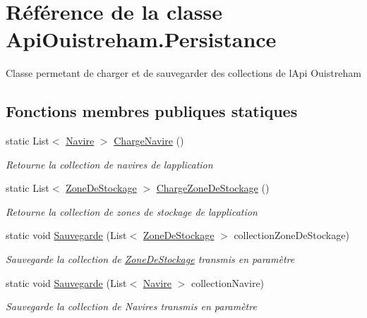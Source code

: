 \hypertarget{class_api_ouistreham_1_1_persistance}{}\section{Référence de la classe Api\+Ouistreham.\+Persistance}
\label{class_api_ouistreham_1_1_persistance}


Classe permetant de charger et de sauvegarder des collections de l\textquotesingle{}Api Ouistreham  


\subsection*{Fonctions membres publiques statiques}
\begin{DoxyCompactItemize}
\item 
static List$<$ \hyperlink{class_api_ouistreham_1_1_navire}{Navire} $>$ \hyperlink{class_api_ouistreham_1_1_persistance_a2df452ff8706e4661261fbd6bb78f467}{Charge\+Navire} ()
\begin{DoxyCompactList}\small\item\em Retourne la collection de navires de l\textquotesingle{}application \end{DoxyCompactList}\item 
static List$<$ \hyperlink{class_api_ouistreham_1_1_zone_de_stockage}{Zone\+De\+Stockage} $>$ \hyperlink{class_api_ouistreham_1_1_persistance_afa6630c405be79ae6d95adcbf64fe6ed}{Charge\+Zone\+De\+Stockage} ()
\begin{DoxyCompactList}\small\item\em Retourne la collection de zones de stockage de l\textquotesingle{}application \end{DoxyCompactList}\item 
static void \hyperlink{class_api_ouistreham_1_1_persistance_a939761c48644380936f1dae6aa97e0e4}{Sauvegarde} (List$<$ \hyperlink{class_api_ouistreham_1_1_zone_de_stockage}{Zone\+De\+Stockage} $>$ collection\+Zone\+De\+Stockage)
\begin{DoxyCompactList}\small\item\em Sauvegarde la collection de \hyperlink{class_api_ouistreham_1_1_zone_de_stockage}{Zone\+De\+Stockage} transmis en paramètre \end{DoxyCompactList}\item 
static void \hyperlink{class_api_ouistreham_1_1_persistance_a592a3f4399acf3f9b48779e6cfc4d526}{Sauvegarde} (List$<$ \hyperlink{class_api_ouistreham_1_1_navire}{Navire} $>$ collection\+Navire)
\begin{DoxyCompactList}\small\item\em Sauvegarde la collection de Navires transmis en paramètre \end{DoxyCompactList}\end{DoxyCompactItemize}


